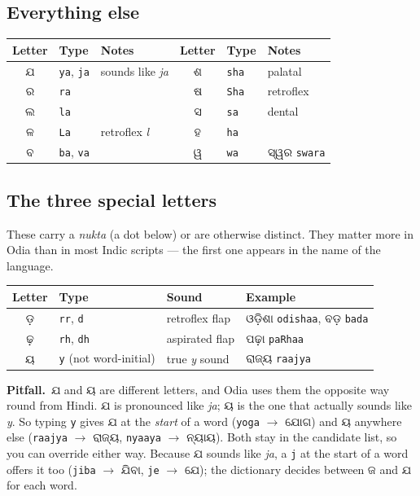 \documentclass[11pt, a4paper]{article}
\newcommand{\od}[1]{{\odiafont #1}}          %
\newcommand{\odb}[1]{{\odiafont\large #1}}   %
\newcommand{\kpit}{{\color{midseaorange!85!black}\textbf{\textsf{Pitfall.}}}\ }
\begin{document}
\subsection*{Everything else}

\begin{center}
\begin{tabular}{c l l c l l}
\toprule
Letter & Type & Notes & Letter & Type & Notes \\
\midrule
\odb{ଯ} & \texttt{ya}, \texttt{ja} & sounds like \emph{ja} & \odb{ଶ} & \texttt{sha} & palatal \\
\odb{ର} & \texttt{ra} &                        & \odb{ଷ} & \texttt{Sha} & retroflex \\
\odb{ଲ} & \texttt{la} &                        & \odb{ସ} & \texttt{sa}  & dental \\
\odb{ଳ} & \texttt{La} & retroflex \emph{l}     & \odb{ହ} & \texttt{ha}  & \\
\odb{ବ} & \texttt{ba}, \texttt{va} &           & \odb{ୱ} & \texttt{wa}  & \od{ସ୍ୱର} \texttt{swara} \\
\bottomrule
\end{tabular}
\end{center}

\subsection*{The three special letters}

These carry a \emph{nukta} (a dot below) or are otherwise distinct. They matter more in
Odia than in most Indic scripts --- the first one appears in the name of the language.

\begin{center}
\begin{tabular}{c l l l}
\toprule
Letter & Type & Sound & Example \\
\midrule
\odb{ଡ଼} & \texttt{rr}, \texttt{d}    & retroflex flap        & \od{ଓଡ଼ିଶା} \texttt{odishaa}, \od{ବଡ଼} \texttt{bada} \\
\odb{ଢ଼} & \texttt{rh}, \texttt{dh}   & aspirated flap        & \od{ପଢ଼ା} \texttt{paRhaa} \\
\odb{ୟ}  & \texttt{y} (not word-initial) & true \emph{y} sound & \od{ରାଜ୍ୟ} \texttt{raajya} \\
\bottomrule
\end{tabular}
\end{center}

\begin{warnbox}
\kpit \od{ଯ} and \od{ୟ} are different letters, and Odia uses them the opposite way round
from Hindi. \od{ଯ} is pronounced like \emph{ja}; \od{ୟ} is the one that actually sounds
like \emph{y}. So typing \texttt{y} gives \od{ଯ} at the \emph{start} of a word
(\texttt{yoga} \(\rightarrow\) \od{ଯୋଗ}) and \od{ୟ} anywhere else
(\texttt{raajya} \(\rightarrow\) \od{ରାଜ୍ୟ}, \texttt{nyaaya} \(\rightarrow\) \od{ନ୍ୟାୟ}).
Both stay in the candidate list, so you can override either way.
Because \od{ଯ} sounds like \emph{ja}, a \texttt{j} at the start of a word offers it
too (\texttt{jiba} \(\rightarrow\) \od{ଯିବା}, \texttt{je} \(\rightarrow\) \od{ଯେ}); the dictionary
decides between \od{ଜ} and \od{ଯ} for each word.
\end{warnbox}
\end{document}
